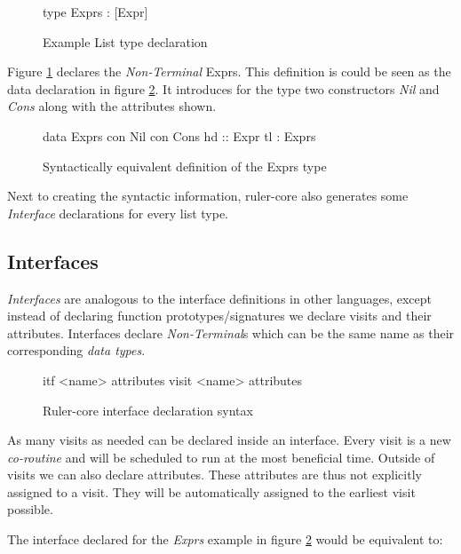 \begin{figure}[h!]
\begin{code}
type Exprs : [Expr]
\end{code}
\caption{Example List type declaration}
\label{type:exprs}
\end{figure}

Figure \ref{type:exprs} declares the \emph{Non-Terminal} Exprs. This definition is could be seen as the data declaration in figure \ref{type:lists}. It introduces for the type two constructors \emph{Nil} and \emph{Cons} along with the attributes shown.

\begin{figure}[h!]
\begin{code}
data Exprs
  con Nil
  con Cons
    hd :: Expr
    tl :  Exprs
\end{code}
\caption{Syntactically equivalent definition of the Exprs type}
\label{type:lists}
\end{figure}

Next to creating the syntactic information, ruler-core also generates some \emph{Interface} declarations for every list type. 

\subsection{Interfaces}
\emph{Interfaces} are analogous to the interface definitions in other languages, except instead of declaring function prototypes/signatures we declare visits and their attributes. Interfaces declare \emph{Non-Terminal}s which can be the same name as their corresponding \emph{data types}.

\begin{figure}[h!]
\begin{code}
itf <name>
  {attributes}
  {visit <name>
    {attributes}
  }
\end{code}
\caption{Ruler-core interface declaration syntax}
\label{itf:syntax}
\end{figure}

As many visits as needed can be declared inside an interface. Every visit is a new \emph{co-routine} and will be scheduled to run at the most beneficial time. Outside of visits we can also declare attributes. These attributes are thus not explicitly assigned to a visit. They will be automatically assigned to the earliest visit possible.

The interface declared for the \emph{Exprs} example in figure \ref{type:lists} would be equivalent to:


